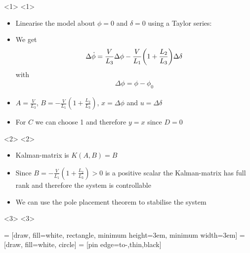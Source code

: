 \begin{frame}

\begin{onlyenv}<1>
<1>
	\begin{itemize}
		\item Linearise the model about $\phi = 0$ and $\delta = 0$ using a Taylor series:
		\item We get
		\begin{align}\label{eq:controler-system}
		\Delta \dot{\phi} = \frac{V}{L_{3}} \Delta \phi - \frac{V}{L_{1}} \qty( 1 + \frac{L_{2}}{L_{3}} ) \Delta \delta 
		\end{align}
		with
		\begin{align*}
		\Delta \phi = \phi - \phi_{0} 
		\end{align*}
		\item $A=\frac{V}{L_3}$, $B = -\frac{V}{L_1}(1+\frac{L_2}{L_3})$, $x = \Delta\phi$ and $u=\Delta\delta$
		\item For $C$ we can choose 1 and therefore $y=x$ since $D=0$
	\end{itemize}
\end{onlyenv}

\begin{onlyenv}<2>
<2>
	\begin{itemize}
		\item Kalman-matrix is $K(A,B) = B$
		\item Since $B = -\frac{V}{L_1}(1+\frac{L_2}{L_3}) > 0$ is a positive scalar the Kalman-matrix has full rank and therefore the system is controllable
		\item We can use the pole placement theorem to stabilise the system
	\end{itemize}
\end{onlyenv}

\begin{onlyenv}<3>
<3>

 = [draw, fill=white, rectangle, minimum height=3em, minimum width=3em]
 = [draw, fill=white, circle]
 = [pin edge={to-,thin,black}]
\begin{figure}[h]
	\centering
\end{figure}
\end{onlyenv}
\end{frame}
